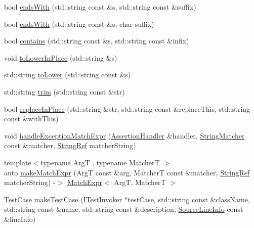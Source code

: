 \begin{DoxyCompactItemize}
\item 
bool \mbox{\hyperlink{namespaceCatch_ada025504f627feaf9ac68ca391515dff}{ends\+With}} (std\+::string const \&s, std\+::string const \&suffix)
\item 
bool \mbox{\hyperlink{namespaceCatch_afd801a3e33fd7a8b91ded0d02747a93f}{ends\+With}} (std\+::string const \&s, char suffix)
\item 
bool \mbox{\hyperlink{namespaceCatch_aa52974b0e426e7e2fbd725a900e9c36e}{contains}} (std\+::string const \&s, std\+::string const \&infix)
\item 
void \mbox{\hyperlink{namespaceCatch_a0760dbe87d090a55a35414db57d272c4}{to\+Lower\+In\+Place}} (std\+::string \&s)
\item 
std\+::string \mbox{\hyperlink{namespaceCatch_ac036a17412d318598ffda8e1fe7a1177}{to\+Lower}} (std\+::string const \&s)
\item 
std\+::string \mbox{\hyperlink{namespaceCatch_a084108b47f37d8bfd5db51c50c7451b3}{trim}} (std\+::string const \&str)
\item 
bool \mbox{\hyperlink{namespaceCatch_afe4e6770da547e43e9e4eeaa05f946ea}{replace\+In\+Place}} (std\+::string \&str, std\+::string const \&replace\+This, std\+::string const \&with\+This)
\item 
void \mbox{\hyperlink{namespaceCatch_a59e375ed0dbd3d6e2f5a29c86c4d8042}{handle\+Exception\+Match\+Expr}} (\mbox{\hyperlink{classCatch_1_1AssertionHandler}{Assertion\+Handler}} \&handler, \mbox{\hyperlink{namespaceCatch_aba438977e831821a2eeca82b9b4f4af2}{String\+Matcher}} const \&matcher, \mbox{\hyperlink{classCatch_1_1StringRef}{String\+Ref}} matcher\+String)
\item 
{\footnotesize template$<$typename ArgT , typename MatcherT $>$ }\\auto \mbox{\hyperlink{namespaceCatch_a08c0e847b66dc31e1174aa9a74a441c9}{make\+Match\+Expr}} (ArgT const \&arg, MatcherT const \&matcher, \mbox{\hyperlink{classCatch_1_1StringRef}{String\+Ref}} matcher\+String) -\/$>$ \mbox{\hyperlink{classCatch_1_1MatchExpr}{Match\+Expr}}$<$ ArgT, MatcherT $>$
\item 
\mbox{\hyperlink{classCatch_1_1TestCase}{Test\+Case}} \mbox{\hyperlink{namespaceCatch_ab69bc97a31a34c3377555f319a1ca616}{make\+Test\+Case}} (\mbox{\hyperlink{structCatch_1_1ITestInvoker}{I\+Test\+Invoker}} $\ast$test\+Case, std\+::string const \&class\+Name, std\+::string const \&name, std\+::string const \&description, \mbox{\hyperlink{structCatch_1_1SourceLineInfo}{Source\+Line\+Info}} const \&line\+Info)
\end{DoxyCompactItemize}


